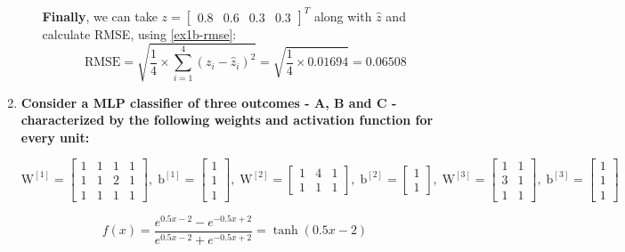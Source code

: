\documentclass[12pt]{article}
\begin{document}
\begin{enumerate}[leftmargin=\labelsep]
\begin{enumerate}
              \textbf{Finally}, we can take $z = \begin{bmatrix}0.8 & 0.6 & 0.3 & 0.3\end{bmatrix}^T$ along with $\hat{z}$ and calculate RMSE, using \eqref{ex1b-rmse}:
              $$
                  \text{RMSE} = \sqrt{\frac{1}{4} \times \sum_{i = 1}^{4} (z_i - \hat{z}_i)^2} = \sqrt{\frac{1}{4} \times 0.01694} = \mathbf{0.06508}
              $$
    \end{enumerate}

    \item \textbf{Consider a MLP classifier of three outcomes - A, B and C - characterized by the following weights and activation function for every unit:} \\

          \begin{center}
              \vskip -0.3cm
              $\text{W}^{[1]} = \begin{bmatrix} 1 & 1 & 1 & 1 \\ 1 & 1 & 2 & 1 \\ 1 & 1 & 1 & 1\end{bmatrix},\; \text{b}^{[1]} = \begin{bmatrix} 1 \\ 1 \\ 1 \end{bmatrix},\;
              \text{W}^{[2]} = \begin{bmatrix} 1 & 4 & 1 \\ 1 & 1 & 1 \end{bmatrix},\; \text{b}^{[2]} = \begin{bmatrix} 1 \\ 1 \end{bmatrix},\;
              \text{W}^{[3]} = \begin{bmatrix} 1 & 1 \\ 3 & 1 \\ 1 & 1\end{bmatrix},\; \text{b}^{[3]} = \begin{bmatrix} 1 \\ 1 \\ 1 \end{bmatrix}$ \\
          \end{center}

          \[ f\left(x\right) = \frac{{e^{0.5x - 2} - e^{-0.5x + 2}}}{{e^{0.5x - 2} + e^{-0.5x + 2}}} = \tanh\left(0.5x - 2\right) \] \\


\end{enumerate}
\end{document}

